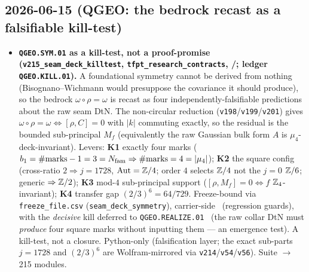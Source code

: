 \subsection*{2026-06-15 (QGEO: the bedrock recast as a falsifiable kill-test)}
\begin{itemize}
\item \textbf{\texttt{QGEO.SYM.01} as a kill-test, not a proof-promise (\texttt{v215\_seam\_deck\_killtest},
  \texttt{tfpt\_research\_contracts}, \mE/\mO; ledger \texttt{QGEO.KILL.01}).} A foundational symmetry cannot
  be derived from nothing (Bisognano--Wichmann would presuppose the covariance it should produce), so the
  bedrock $\omega\circ\rho=\omega$ is recast as four independently-falsifiable predictions about the raw seam
  DtN. The non-circular reduction (\texttt{v198}/\texttt{v199}/\texttt{v201}) gives
  $\omega\circ\rho=\omega\Leftrightarrow[\rho,C]=0$ with $|k|$ commuting exactly, so the residual is the
  bounded sub-principal $M_f$ (equivalently the raw Gaussian bulk form $A$ is $\mu_4$-deck-invariant). Levers:
  \textbf{K1} exactly four marks ($b_1=\#\text{marks}-1=3=N_{\mathrm{fam}}\Rightarrow\#\text{marks}=4=|\mu_4|$);
  \textbf{K2} the square config (cross-ratio $2\Rightarrow j=1728$, $\mathrm{Aut}=\mathbb{Z}/4$; order $4$ selects
  $\mathbb{Z}/4$ not the $j=0$ $\mathbb{Z}/6$; generic $\Rightarrow\mathbb{Z}/2$); \textbf{K3} mod-$4$ sub-principal support
  ($[\rho,M_f]=0\Leftrightarrow f$ $\mathbb{Z}_4$-invariant); \textbf{K4} transfer gap $(2/3)^6=64/729$. Freeze-bound
  via \texttt{freeze\_file.csv} (\texttt{seam\_deck\_symmetry}), carrier-side \mE\ (regression guards), with
  the \emph{decisive} kill deferred to \texttt{QGEO.REALIZE.01} \mO\ (the raw collar DtN must \emph{produce}
  four square marks without inputting them --- an emergence test). A kill-test, not a closure. Python-only
  (falsification layer; the exact sub-parts $j=1728$ and $(2/3)^6$ are Wolfram-mirrored via
  \texttt{v214}/\texttt{v54}/\texttt{v56}). Suite $\to$ 215 modules.
\end{itemize}

